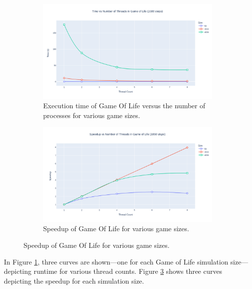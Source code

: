 \documentclass{article}
\newcommand{\eng}[1]{#1}
\begin{document}
\begin{figure}[h]
    \centering
    \begin{subfigure}{0.8275\textwidth}
        \includegraphics[width=\textwidth]{../a1/report/graphs/time_game_of_life.png} 
        \caption{Execution time of \eng{Game Of Life} versus the number of processes for various game sizes.}
        \label{fig:stats}
    \end{subfigure}
    \centering
    \begin{subfigure}{0.8275\textwidth}
        \includegraphics[width=\textwidth]{../a1/report/graphs/speedup_game_of_life.png} 
        \caption{Speedup of \eng{Game Of Life} for various game sizes.}
        \label{fig:speedup}
    \end{subfigure}
\end{figure}
\FloatBarrier

In Figure \ref{fig:stats}, three curves are shown—one for each \eng{Game of Life} simulation size—depicting runtime for various thread counts. Figure \ref{fig:speedup} shows three curves depicting the speedup for each simulation size.
\end{document}
